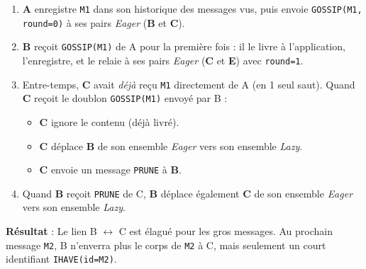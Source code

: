 \documentclass[11pt,a4paper]{article}
\begin{document}
\begin{enumerate}
    \item \textbf{A} enregistre \texttt{M1} dans son historique des messages vus, puis envoie \texttt{GOSSIP(M1, round=0)} à ses pairs \emph{Eager} (\textbf{B} et \textbf{C}).
    \item \textbf{B} reçoit \texttt{GOSSIP(M1)} de A pour la première fois : il le livre à l'application, l'enregistre, et le relaie à ses pairs \emph{Eager} (\textbf{C} et \textbf{E}) avec \texttt{round=1}.
    \item Entre-temps, \textbf{C} avait \emph{déjà} reçu \texttt{M1} directement de A (en 1 seul saut). Quand \textbf{C} reçoit le doublon \texttt{GOSSIP(M1)} envoyé par B :
    \begin{itemize}
        \item \textbf{C} ignore le contenu (déjà livré).
        \item \textbf{C} déplace \textbf{B} de son ensemble \emph{Eager} vers son ensemble \emph{Lazy}.
        \item \textbf{C} envoie un message \texttt{PRUNE} à \textbf{B}.
    \end{itemize}
    \item Quand \textbf{B} reçoit \texttt{PRUNE} de C, \textbf{B} déplace également \textbf{C} de son ensemble \emph{Eager} vers son ensemble \emph{Lazy}.
\end{enumerate}
\textbf{Résultat} : Le lien B $\leftrightarrow$ C est élagué pour les gros messages. Au prochain message \texttt{M2}, B n'enverra plus le corps de \texttt{M2} à C, mais seulement un court identifiant \texttt{IHAVE(id=M2)}.
\end{document}
